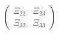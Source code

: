 \begin{equation}
\left( \begin{array}{cc}
\Xi_{22} & \Xi_{23} \\
\Xi_{32}  & \Xi_{33}
\end{array}  \right)
\end{equation}

